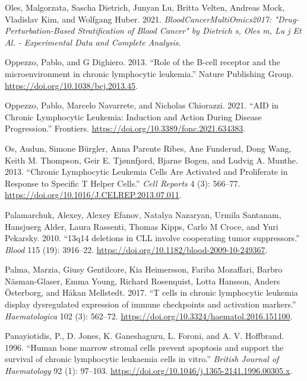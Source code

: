 \documentclass[11pt, a4paper, twosided]{book}
\newenvironment{CSLReferences}%
  {}%
  {\par}
\begin{document}
\begin{CSLReferences}{1}{0}
\leavevmode{}%
Oles, Malgorzata, Sascha Dietrich, Junyan Lu, Britta Velten, Andreas Mock, Vladislav Kim, and Wolfgang Huber. 2021. \emph{BloodCancerMultiOmics2017: "Drug-Perturbation-Based Stratification of Blood Cancer" by Dietrich s, Oles m, Lu j Et Al. - Experimental Data and Complete Analysis}.

\leavevmode{}%
Oppezzo, Pablo, and G Dighiero. 2013. {``{Role of the B-cell receptor and the microenvironment in chronic lymphocytic leukemia}.''} Nature Publishing Group. \url{https://doi.org/10.1038/bcj.2013.45}.

\leavevmode{}%
Oppezzo, Pablo, Marcelo Navarrete, and Nicholas Chiorazzi. 2021. {``{AID in Chronic Lymphocytic Leukemia: Induction and Action During Disease Progression}.''} Frontiers. \url{https://doi.org/10.3389/fonc.2021.634383}.

\leavevmode{}%
Os, Audun, Simone Bürgler, Anna Parente Ribes, Ane Funderud, Dong Wang, Keith M. Thompson, Geir E. Tjønnfjord, Bjarne Bogen, and Ludvig A. Munthe. 2013. {``{Chronic Lymphocytic Leukemia Cells Are Activated and Proliferate in Response to Specific T Helper Cells}.''} \emph{Cell Reports} 4 (3): 566--77. \url{https://doi.org/10.1016/J.CELREP.2013.07.011}.

\leavevmode{}%
Palamarchuk, Alexey, Alexey Efanov, Natalya Nazaryan, Urmila Santanam, Hansjuerg Alder, Laura Rassenti, Thomas Kipps, Carlo M Croce, and Yuri Pekarsky. 2010. {``{13q14 deletions in CLL involve cooperating tumor suppressors}.''} \emph{Blood} 115 (19): 3916--22. \url{https://doi.org/10.1182/blood-2009-10-249367}.

\leavevmode{}%
Palma, Marzia, Giusy Gentilcore, Kia Heimersson, Fariba Mozaffari, Barbro Näsman-Glaser, Emma Young, Richard Rosenquist, Lotta Hansson, Anders Österborg, and Håkan Mellstedt. 2017. {``{T cells in chronic lymphocytic leukemia display dysregulated expression of immune checkpoints and activation markers}.''} \emph{Haematologica} 102 (3): 562--72. \url{https://doi.org/10.3324/haematol.2016.151100}.

\leavevmode{}%
Panayiotidis, P., D. Jones, K. Ganeshaguru, L. Foroni, and A. V. Hoffbrand. 1996. {``{Human bone marrow stromal cells prevent apoptosis and support the survival of chronic lymphocytic leukaemia cells in vitro}.''} \emph{British Journal of Haematology} 92 (1): 97--103. \url{https://doi.org/10.1046/j.1365-2141.1996.00305.x}.


\end{CSLReferences}
\end{document}
